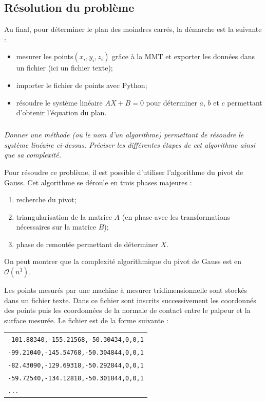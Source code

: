 \documentclass[10pt,fleqn]{article} %
\begin{document}
\else
\fi


\subsection{Résolution du problème}
\ifprof
\else
\begin{methode}
Au final, pour déterminer le plan des moindres carrés, la démarche est la suivante :
\begin{itemize}
\item mesurer les points$(x_i,y_i,z_i)$ grâce à la MMT et exporter les données dans un fichier (ici un fichier texte);
\item importer le fichier de points avec Python;
\item résoudre le système linéaire $AX+B=0$ pour déterminer $a$, $b$ et $c$ permettant d'obtenir l'équation du plan. 
\end{itemize}
\end{methode}
\fi

\subparagraph{}
\textit{Donner une méthode (ou le nom d'un algorithme) permettant de résoudre le système linéaire ci-dessus. Préciser les différentes étapes de cet algorithme ainsi que sa complexité.}


\ifprof
\begin{corrige}
Pour résoudre ce problème, il est possible d'utiliser l'algorithme du pivot de Gauss. Cet algorithme se déroule en trois phases majeures : 
\begin{enumerate}
\item recherche du pivot;
\item triangularisation de la matrice $A$ (en phase avec les transformations nécessaires sur la matrice $B$);
\item phase de remontée permettant de déterminer $X$. 
\end{enumerate}

On peut montrer que la complexité algorithmique du pivot de Gauss est en $\mathcal{O}\left(n^3\right)$.
\end{corrige}
\else
\fi
\ifprof
\else
\vspace{.5cm}

Les points mesurés par une machine à mesurer tridimensionnelle sont stockés dans un fichier texte. Dans ce fichier sont inscrits successivement les coordonnés des points puis les coordonnées de la normale de contact entre le palpeur et la surface mesurée. Le fichier est de la forme suivante : 

\begin{tabular}{l}
\texttt{-101.88340,-155.21568,-50.30434,0,0,1}\\
\texttt{-99.21040,-145.54768,-50.304844,0,0,1}\\
\texttt{-82.43090,-129.69318,-50.292844,0,0,1}\\
\texttt{-59.72540,-134.12818,-50.301844,0,0,1}\\
\texttt{...} \\
\end{tabular}
\end{document}

